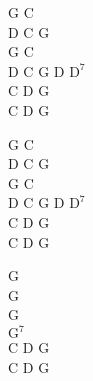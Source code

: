 \begin{chord}
    G C\\
    D C G\\
    G C\\
    D C G D $\mathrm{D^{7}}$\\
    C D G\\
    C D G

    G C\\
    D C G\\
    G C\\
    D C G D $\mathrm{D^{7}}$\\
    C D G\\
    C D G

    G\\
    G\\
    G\\
    $\mathrm{G^{7}}$\\
    C D G\\
    C D G
\end{chord}
